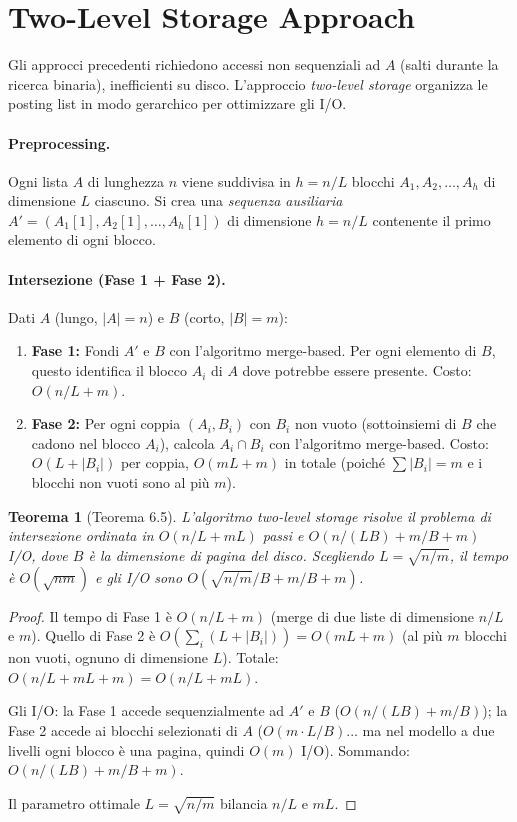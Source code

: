 \documentclass[12pt, a4paper, oneside]{book}
\theoremstyle{plain}
\newtheorem{teorema}{Teorema}[chapter]
\theoremstyle{definition}
\theoremstyle{remark}
\begin{document}
\section{Two-Level Storage Approach}

Gli approcci precedenti richiedono accessi non sequenziali ad $A$ (salti durante la ricerca binaria), inefficienti su disco. L'approccio \emph{two-level storage} organizza le posting list in modo gerarchico per ottimizzare gli I/O.

\paragraph{Preprocessing.} Ogni lista $A$ di lunghezza $n$ viene suddivisa in $h = n/L$ blocchi $A_1, A_2, \ldots, A_h$ di dimensione $L$ ciascuno. Si crea una \emph{sequenza ausiliaria} $A' = (A_1[1], A_2[1], \ldots, A_h[1])$ di dimensione $h = n/L$ contenente il primo elemento di ogni blocco.

\paragraph{Intersezione (Fase 1 + Fase 2).} Dati $A$ (lungo, $|A| = n$) e $B$ (corto, $|B| = m$):

\begin{enumerate}
  \item \textbf{Fase 1:} Fondi $A'$ e $B$ con l'algoritmo merge-based. Per ogni elemento di $B$, questo identifica il blocco $A_i$ di $A$ dove potrebbe essere presente. Costo: $O(n/L + m)$.
  \item \textbf{Fase 2:} Per ogni coppia $(A_i, B_i)$ con $B_i$ non vuoto (sottoinsiemi di $B$ che cadono nel blocco $A_i$), calcola $A_i \cap B_i$ con l'algoritmo merge-based. Costo: $O(L + |B_i|)$ per coppia, $O(mL + m)$ in totale (poiché $\sum|B_i| = m$ e i blocchi non vuoti sono al più $m$).
\end{enumerate}

\begin{teorema}[Teorema 6.5]
L'algoritmo two-level storage risolve il problema di intersezione ordinata in $O(n/L + mL)$ passi e $O(n/(LB) + m/B + m)$ I/O, dove $B$ è la dimensione di pagina del disco. Scegliendo $L = \sqrt{n/m}$, il tempo è $O(\sqrt{nm})$ e gli I/O sono $O(\sqrt{n/m}/B + m/B + m)$.
\end{teorema}

\begin{proof}
Il tempo di Fase 1 è $O(n/L + m)$ (merge di due liste di dimensione $n/L$ e $m$). Quello di Fase 2 è $O(\sum_i (L + |B_i|)) = O(mL + m)$ (al più $m$ blocchi non vuoti, ognuno di dimensione $L$). Totale: $O(n/L + mL + m) = O(n/L + mL)$.

Gli I/O: la Fase 1 accede sequenzialmente ad $A'$ e $B$ ($O(n/(LB) + m/B)$); la Fase 2 accede ai blocchi selezionati di $A$ ($O(m \cdot L/B)$... ma nel modello a due livelli ogni blocco è una pagina, quindi $O(m)$ I/O). Sommando: $O(n/(LB) + m/B + m)$.

Il parametro ottimale $L = \sqrt{n/m}$ bilancia $n/L$ e $mL$.
\end{proof}
\end{document}
